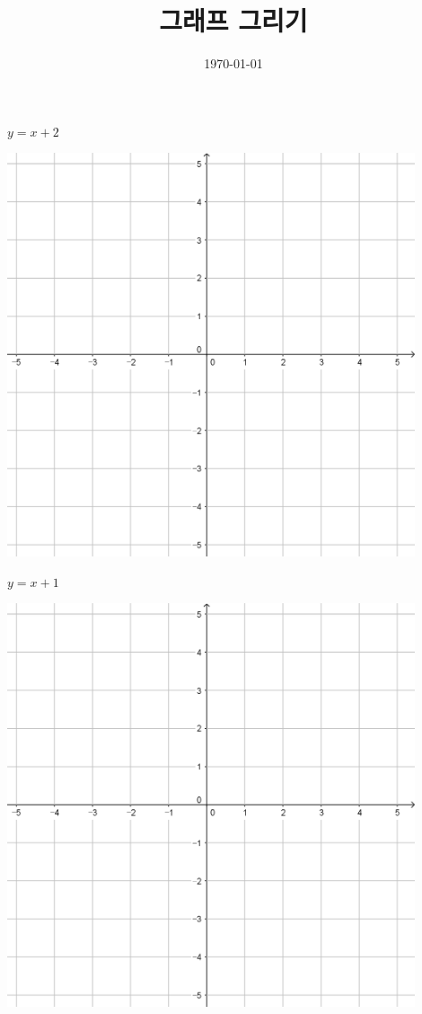 \documentclass[a4paper]{oblivoir}
\title{그래프 그리기}
\date{\today}
\author{}
\begin{document}
\maketitle

\begin{minipage}{0.45\textwidth}\centering
\(y=x+2\)
\par\bigskip\includegraphics[width=0.9\textwidth]{55}
\end{minipage}
\begin{minipage}{0.45\textwidth}\centering
\(y=x+1\)
\par\bigskip\includegraphics[width=0.9\textwidth]{55}
\end{minipage}\bigskip\bigskip\par
\end{document}

